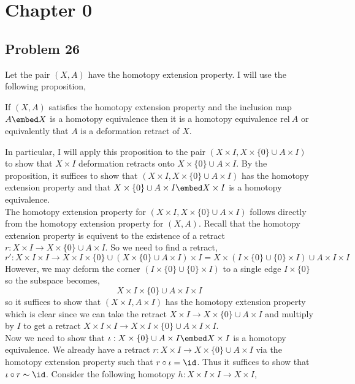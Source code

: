 \documentclass[12pt]{extarticle}
\begin{document}

\section{Chapter 0}

\subsection{Problem 26}

Let the pair $(X, A)$ have the homotopy extension property. I will use the following proposition, 

\begin{proposition}[Hatcher 0.20]
If $(X, A)$ satisfies the homotopy extension property and the inclusion map $A \embed X$ is a homotopy equivalence then it is a homotopy equivalence $\mathrm{rel} \: A$ or equivalently that $A$ is a deformation retract of $X$. 
\end{proposition}
\noindent
In particular, I will apply this proposition to the pair $(X \times I, X \times \{ 0 \} \cup A \times I)$ to show that $X \times I$ deformation retracts onto $X \times \{ 0 \} \cup A \times I$. By the proposition, it suffices to show that $(X \times I, X \times \{ 0 \} \cup A \times I)$ has the homotopy extension property and that $X \times \{ 0 \} \cup A \times I \embed X \times I$ is a homotopy equivalence. 
\bigskip\\
The homotopy extension property for $(X \times I, X \times \{ 0 \} \cup A \times I)$ follows directly from the homotopy extension property for $(X, A)$. Recall that the homotopy extension property is equivent to the existence of a retract $r : X \times I \to X \times \{ 0 \} \cup A \times I$. So we need to find a retract,
\[ r' : X \times I \times I \to X \times I \times \{ 0 \} \cup (X \times \{ 0 \} \cup A \times I) \times I = X \times (I \times \{ 0 \} \cup \{ 0 \} \times I) \cup A \times I \times I \]
However, we may deform the corner $(I \times \{ 0 \} \cup \{ 0 \} \times I)$ to a single edge $I \times \{ 0 \}$ so the subspace becomes,
\[ X \times I \times \{ 0 \} \cup A \times I \times I \]
so it suffices to show that $(X \times I, A \times I)$ has the homotopy extension property which is clear since we can take the retract $X \times I \to X \times \{0\} \cup A \times I$ and multiply by $I$ to get a retract $X \times I \times I \to X \times I \times \{ 0 \} \cup A \times I \times I$. 
\bigskip\\
Now we need to show that $\iota : X \times \{0 \} \cup A \times I \embed X \times I$ is a homotopy equivalence. We already have a retract $r : X \times I \to X \times \{ 0 \} \cup A \times I$ via the homotopy extension property such that $r \circ \iota = \id$. Thus it suffices to show that $\iota \circ r \sim \id$. Consider the following homotopy $h : X \times I \times I \to X \times I$,
\end{document}
